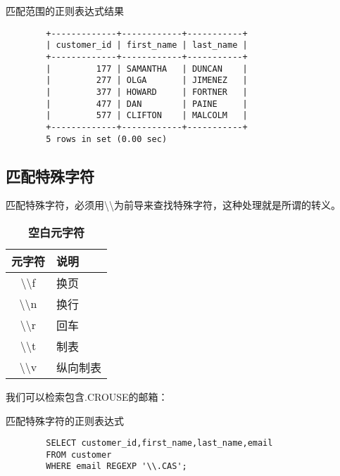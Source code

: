 \documentclass[UTF8]{article}
\begin{document}
\begin{listing}[H]
	\caption{匹配范围的正则表达式结果}
	\label{code:rangematchzhengzeresult}
\begin{verbatim}
        +-------------+------------+-----------+
        | customer_id | first_name | last_name |
        +-------------+------------+-----------+
        |         177 | SAMANTHA   | DUNCAN    |
        |         277 | OLGA       | JIMENEZ   |
        |         377 | HOWARD     | FORTNER   |
        |         477 | DAN        | PAINE     |
        |         577 | CLIFTON    | MALCOLM   |
        +-------------+------------+-----------+
        5 rows in set (0.00 sec)
\end{verbatim}
\end{listing}

\subsection{匹配特殊字符}

\begin{redbox}[frametitle={Defination 9.5.1 转义（escaping）}]
        匹配特殊字符，必须用\textbackslash \textbackslash 为前导来查找特殊字符，这种处理就是所谓的转义。
\end{redbox}

\begin{table}[H]
        \caption{\textbf{空白元字符}}%
        \centering%
        \begin{tabular}{cl}
        \toprule%
        元字符&说明\\
        \midrule%
        \textbackslash \textbackslash f       &       换页                  \\
        \textbackslash \textbackslash n      &       换行                  \\
        \textbackslash \textbackslash r     &       回车                  \\
        \textbackslash \textbackslash t       &      制表                   \\
        \textbackslash \textbackslash v       &      纵向制表                   \\
        \bottomrule%
        \end{tabular}
\end{table}  

我们可以检索包含.CROUSE的邮箱：

\begin{listing}[H]
	\caption{匹配特殊字符的正则表达式}
	\label{code:specialmatchzhengze}
\begin{verbatim}
        SELECT customer_id,first_name,last_name,email 
        FROM customer 
        WHERE email REGEXP '\\.CAS';
\end{verbatim}
\end{listing}
\end{document}
